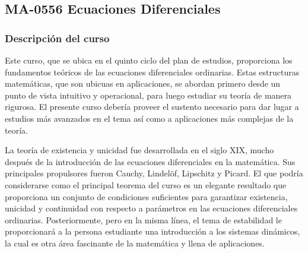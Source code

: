 \newpage
\subsection*{MA-0556 Ecuaciones Diferenciales}

\hypertarget{MA0556}{}
\begin{refsection}


\begin{table}[H]
\end{table} 


\subsubsection*{Descripción del curso}

Este curso, que se ubica en el quinto ciclo del plan de estudios, proporciona los fundamentos teóricos de las ecuaciones diferenciales ordinarias. Estas estructuras matemáticas, que son ubicuas en aplicaciones, se abordan primero desde un punto de vista intuitivo y operacional, para luego estudiar su teoría de manera rigurosa. El presente curso debería proveer el sustento necesario para dar lugar a estudios más avanzados en el tema así como a aplicaciones más complejas de la teoría. 

La teoría de existencia y unicidad fue desarrollada en el siglo XIX, mucho después de la introducción de las ecuaciones diferenciales en la matemática. Sus principales propulsores fueron Cauchy, Lindelöf, Lipschitz y Picard. El que podría considerarse como el principal teorema del curso es un elegante resultado que proporciona un conjunto de condiciones suficientes para garantizar existencia, unicidad y continuidad con respecto a parámetros en las ecuaciones diferenciales ordinarias. Posteriormente, pero en la misma línea, el tema de estabilidad le proporcionará a la persona estudiante una introducción a los sistemas dinámicos, la cual es otra área fascinante de la matemática y llena de aplicaciones.


\end{refsection}
